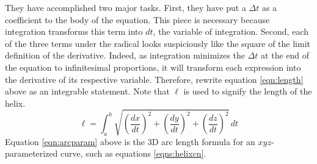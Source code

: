 \documentclass{article}
\begin{document}
They have accomplished two major tasks. First, they have put a $\Delta t$ as a coefficient to the body of the equation. This piece is necessary because integration transforms this term into $dt$, the variable of integration. Second, each of the three terms under the radical looks suspiciously like the square of the limit definition of the derivative. Indeed, as integration minimizes the $\Delta t$ at the end of the equation to infinitesimal proportions, it will transform each expression into the derivative of its respective variable. Therefore, rewrite equation \ref{eqn:length} above as an integrable statement. Note that $\ell$ is used to signify the length of the helix.
\begin{equation}\label{eqn:arcparam}
    \ell = \int_a^b\sqrt{\left(\frac{dx}{dt}\right)^2+\left(\frac{dy}{dt}\right)^2+\left(\frac{dz}{dt}\right)^2}\, dt
\end{equation}
Equation \ref{eqn:arcparam} above is the 3D arc length formula for an $xyz$-parameterized curve, such as equations \ref{eqns:helixcn}.
\end{document}
